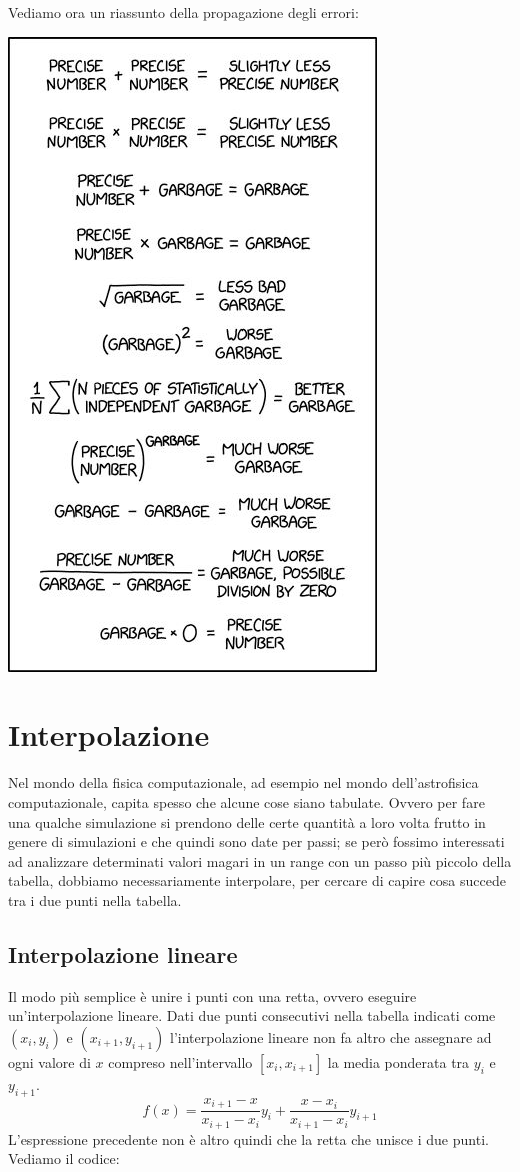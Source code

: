 \documentclass[10pt,a4paper]{article}
\begin{document}
Vediamo ora un riassunto della propagazione degli errori:

\includegraphics[scale=1.5]{img/analisi.jpeg}



\newpage

\section{Interpolazione}
Nel mondo della fisica computazionale, ad esempio nel mondo dell'astrofisica computazionale, capita spesso che alcune cose siano tabulate. Ovvero per fare una qualche simulazione si prendono delle certe quantità a loro volta frutto in genere di simulazioni e che quindi sono date per passi; se però fossimo interessati ad analizzare determinati valori magari in un range con un passo più piccolo della tabella, dobbiamo necessariamente interpolare, per cercare di capire cosa succede tra i due punti nella tabella.
\subsection{Interpolazione lineare}
Il modo più semplice è unire i punti con una retta, ovvero eseguire un'interpolazione lineare. Dati due punti consecutivi nella tabella indicati come $(x_i, y_i)$ e $(x_{i+1}, y_{i+1})$ l'interpolazione lineare non fa altro che assegnare ad ogni valore di $x$  compreso nell'intervallo $[x_i, x_{i+1}]$ la media ponderata tra $y_i$  e $y_{i+1}$.
\[
f(x) = \frac{x_{i+1} - x}{x_{i+1} - x_{i}} y_i + \frac{x-x_{i}}{x_{i+1}- x_{i}} y_{i+1}
\]
L'espressione precedente non è altro quindi che la retta che unisce i due punti. Vediamo il codice:
\end{document}
